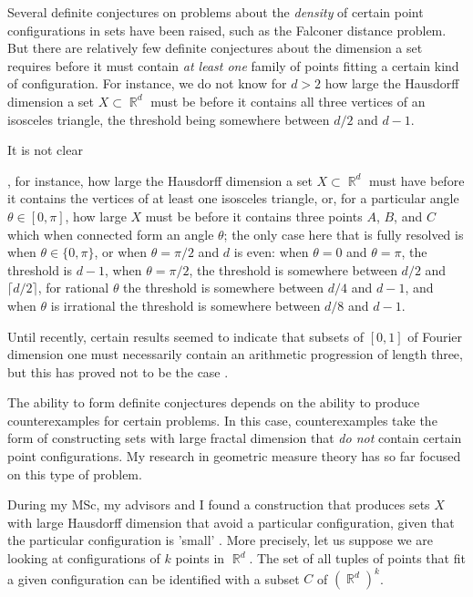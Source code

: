 \documentclass[12pt]{article}
\DeclareMathOperator{\RR}{\mathbb{R}}
\begin{document}
Several definite conjectures on problems about the \emph{density} of certain point configurations in sets have been raised, such as the Falconer distance problem. %
But there are relatively few definite conjectures about the dimension a set requires before it must contain \emph{at least one} family of points fitting a certain kind of configuration. For instance, we do not know for $d > 2$ how large the Hausdorff dimension a set $X \subset \RR^d$ must be before it contains all three vertices of an isosceles triangle, the threshold being somewhere between $d/2$ and $d-1$.

 It is not clear

, for instance, how large the Hausdorff dimension a set $X \subset \RR^d$ must have before it contains the vertices of at least one isosceles triangle, or, for a particular angle $\theta \in [0,\pi]$, how large $X$ must be before it contains three points $A$, $B$, and $C$ which when connected form an angle $\theta$; the only case here that is fully resolved is when $\theta \in \{ 0, \pi \}$, or when $\theta = \pi/2$ and $d$ is even: when $\theta = 0$ and $\theta = \pi$, the threshold is $d-1$, when $\theta = \pi/2$, the threshold is somewhere between $d/2$ and $\lceil d/2 \rceil$, for rational $\theta$ the threshold is somewhere between $d/4$ and $d-1$, and when $\theta$ is irrational the threshold is somewhere between $d/8$ and $d-1$.

Until recently, certain results \cite{LabaPramanik} seemed to indicate that subsets of $[0,1]$ of Fourier dimension one must necessarily contain an arithmetic progression of length three, but this has proved not to be the case \cite{Schmerkin}.

The ability to form definite conjectures depends on the ability to produce counterexamples for certain problems. In this case, counterexamples take the form of constructing sets with large fractal dimension that \emph{do not} contain certain point configurations. My research in geometric measure theory has so far focused on this type of problem.

During my MSc, my advisors and I found a construction that produces sets $X$ with large Hausdorff dimension that avoid a particular configuration, given that the particular configuration is 'small' \cite{DensonPramanikZahl}. More precisely, let us suppose we are looking at configurations of $k$ points in $\RR^d$. The set of all tuples of points that fit a given configuration can be identified with a subset $C$ of $(\RR^d)^k$.
\end{document}
